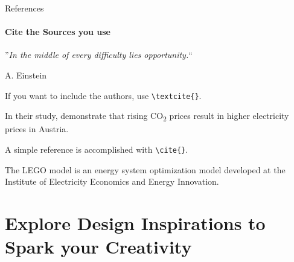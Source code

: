 \documentclass[aspectratio=169]{beamer}
\begin{document}
\begin{frame}
\end{frame}


\begin{frame}{References}
    \framesubtitle{Cite the Sources you use}

  \begin{coloredblock}[grey]
    \centering
      ”\textit{In the middle of every difficulty lies opportunity.}“
      
      \vspace{0.7cm}
      \scriptsize A. Einstein \cite{einstein2018}
  \end{coloredblock}

  \begin{coloredblock}
      If you want to include the authors, use \texttt{\textbackslash textcite\{\}}.

      \vspace{0.5cm}
      In their study, \textbf{\textcite{gaugl2023}} demonstrate that rising CO\textsubscript{2} prices result in higher electricity prices in Austria.
  \end{coloredblock}

  \begin{coloredblock}
      A simple reference is accomplished with \texttt{\textbackslash cite\{\}}.

      \vspace{0.5cm}
      The LEGO model is an energy system optimization model developed at the Institute of Electricity Economics and Energy Innovation. \textbf{\cite{wogrin2022}}
  \end{coloredblock}

\end{frame}


\section{Explore \textbf{Design Inspirations} to Spark  your Creativity}

\end{document}
